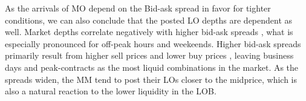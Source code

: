 \documentclass[12pt,a4paper]{cau_thesis}
\begin{document}
As the arrivals of MO depend on the Bid-ask spread in favor for
tighter conditions, we can also conclude that the posted LO depths
are dependent as well. Market depths correlate negatively with higher
bid-ask spreads \cite[see ][, p.237]{balardy2022empirical}, what is
especially pronounced for off-peak hours and weekeends. Higher
bid-ask spreads primarily result from higher sell prices and lower
buy prices \cite[][, p.237]{balardy2022empirical}, leaving business
days and peak-contracts as the most liquid combinations in the
market. As the spreads widen, the MM tend to post their LOs closer to
the midprice, which is also a natural reaction to the lower liquidity
in the LOB.
\end{document}
